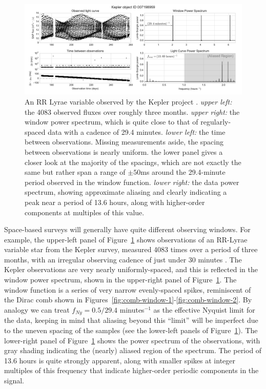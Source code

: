 \documentclass[preprint]{aastex}
\newcommand{\fig}[1]{Figure~\ref{fig:#1}}
\newcommand{\figs}[2]{Figures~\ref{fig:#1}-\ref{fig:#2}}
\newcommand{\figlabel}[1]{\label{fig:#1}}
\begin{document}
\begin{figure}[ht]
  \centering
  \includegraphics[width=\textwidth]{fig16_kepler_data}
  \caption{An RR Lyrae variable observed by the Kepler project \citep[see][]{Kolenberg2010}.
    {\it upper left:} the 4083 observed fluxes over roughly three months.
    {\it upper right:} the window power spectrum, which is quite close to that of regularly-spaced data with a cadence of 29.4 minutes.
    {\it lower left:} the time between observations. Missing measurements aside, the spacing between observations is nearly uniform. the lower panel gives a closer look at the majority of the spacings, which are not exactly the same but rather span a range of $\pm 50$ms around the 29.4-minute period observed in the window function.
    {\it lower right:} the data power spectrum, showing approximate aliasing and clearly indicating a peak near a period of 13.6 hours, along with higher-order components at multiples of this value.
    \figlabel{kepler-data}}
\end{figure}

Space-based surveys will generally have quite different observing windows.
For example, the upper-left panel of \fig{kepler-data}
shows observations of an RR-Lyrae variable star from the Kepler survey,
measured 4083 times over a period of three months,
with an irregular observing cadence of just under 30 minutes
 \citep[For deeper discussion of these observations, see][]{Kolenberg2010}.
The Kepler observations are very nearly uniformly-spaced, and this is reflected
in the window power spectrum, shown in the upper-right panel of
\fig{kepler-data}.
The window function is a series of very narrow evenly-spaced spikes,
reminiscent of the Dirac comb shown in \figs{comb-window-1}{comb-window-2}.
By analogy we can treat $f_{Ny} = 0.5/29.4$ minutes$^{-1}$ as the
effective Nyquist limit for the data, keeping in mind that aliasing beyond this
``limit'' will be imperfect due to the uneven spacing of the samples
(see the lower-left panels of \fig{kepler-data}).
The lower-right panel of \fig{kepler-data} shows the power spectrum of the
observations, with gray shading indicating the (nearly) aliased region
of the spectrum.
The period of 13.6 hours is quite strongly apparent, along with smaller spikes
at integer multiples of this frequency that indicate higher-order periodic
components in the signal.
\end{document}
